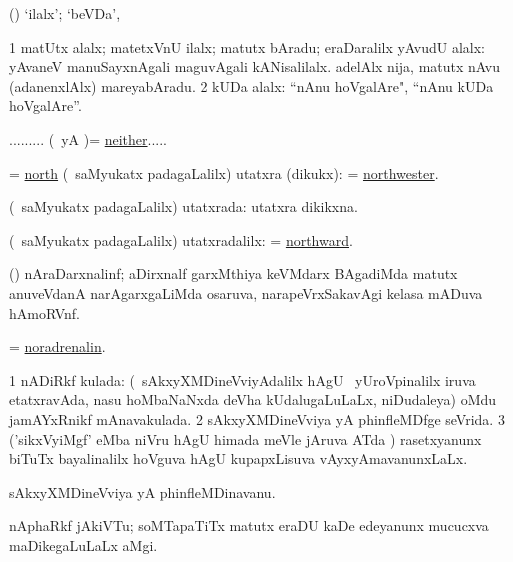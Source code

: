 \bentry
{}
\gl{\kirxvi}
\bmng
(\AmA) `ilalx'; `beVDa', 
\emng
\eentry

\bentry
{}
\gl{\saMavayx}
\bmng
\bnum
\num{1} matUtx alalx; matetxVnU ilalx; matutx bAradu; eraDaralilx yAvudU alalx:  yAvaneV manuSayxnAgali maguvAgali kANisalilalx.  adelAlx nija, matutx nAvu (adanenxlAlx) mareyabAradu. 
\num{2} kUDa alalx:  ``nAnu hoVgalAre", ``nAnu kUDa hoVgalAre''. 
\enum
\emng

\noindent
\gl{\pagu}
\bmng
{}......... (\kAparx\ yA \pArxparx)= \hyperlink{neither(1)}{neither}..... 
\emng
\eentry

\bentry
{}
\gl{\nA}
\bmng
 = \hyperlink{north(1)}{north} (\kanmu\ saMyukatx padagaLalilx) utatxra (dikukx):  = \hyperlink{northwester}{northwester}. 
\emng
\eentry

\bentry
{}
\gl{\gu}
\bmng
(\kanmu\ saMyukatx padagaLalilx) utatxrada: utatxra dikikxna. 
\emng
\eentry

\bentry
{}
\gl{\kirxvi}
\bmng
(\kanmu\ saMyukatx padagaLalilx) utatxradalilx:  = \hyperlink{northward(1)}{northward}. 
\emng
\eentry

\bentry
{}
\gl{\nA}
\bmng
(\jiVra) nAraDarxnalinf; aDirxnalf garxMthiya keVMdarx BAgadiMda matutx anuveVdanA narAgarxgaLiMda osaruva, narapeVrxSakavAgi kelasa mADuva hAmoRVnf. 
\emng
\eentry

\bentry
{}
\gl{\nA}
\bmng
= \hyperlink{noradrenalin}{noradrenalin}. 
\emng
\eentry

\bentry
{}
\gl{\gu}
\bmng
\bnum
\num{1} nADiRkf kulada: (\kanmu\ sAkxyXMDineVviyAdalilx hAgU \kanu\ yUroVpinalilx iruva etatxravAda, nasu hoMbaNaNxda deVha kUdalugaLuLaLx, niDudaleya) oMdu jamAYxRnikf mAnavakulada. 
\num{2} sAkxyXMDineVviya yA phinfleMDfge seVrida. 
\num{3} ('sikxVyiMgf' eMba niVru hAgU himada meVle jAruva ATda \vi) rasetxyanunx biTuTx bayalinalilx hoVguva hAgU kupapxLisuva vAyxyAmavanunxLaLx. 
\enum
\emng
\eentry

\bentry
{}
\gl{\nA}
\bmng
sAkxyXMDineVviya yA phinfleMDinavanu. 
\emng
\eentry

\bentry
{}
\gl{\nA}
\bmng
nAphaRkf jAkiVTu; soMTapaTiTx matutx eraDU kaDe edeyanunx mucucxva maDikegaLuLaLx aMgi.  
\emng
\eentry

